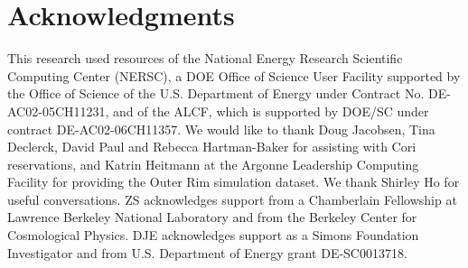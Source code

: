 \section{Acknowledgments}
This research used resources of the National Energy Research Scientific Computing Center (NERSC), a DOE Office of Science User Facility supported by the Office of Science of the U.S. Department of Energy under Contract No. DE-AC02-05CH11231, and of the ALCF, which is supported by DOE/SC under contract DE-AC02-06CH11357. 
We would like to thank Doug Jacobsen, Tina Declerck, David Paul and Rebecca Hartman-Baker for assisting with Cori reservations, and Katrin Heitmann at the Argonne Leadership Computing Facility for providing the Outer Rim simulation dataset.
We thank Shirley Ho for useful conversations.
ZS acknowledges support from a Chamberlain Fellowship at Lawrence Berkeley National Laboratory and from the Berkeley Center for Cosmological Physics. DJE acknowledges support as a Simons Foundation Investigator and
from U.S. Department of Energy grant DE-SC0013718.
